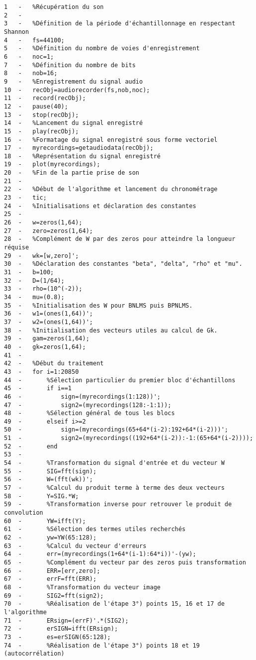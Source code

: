 \begin{verbatim}
1   -	%Récupération du son
2   -	
3   -	%Définition de la période d'échantillonnage en respectant Shannon
4   -	fs=44100;
5   -	%Définition du nombre de voies d'enregistrement
6   -	noc=1;
7   -	%Définition du nombre de bits
8   -	nob=16;
9   -	%Enregistrement du signal audio
10  -	recObj=audiorecorder(fs,nob,noc);
11  -	record(recObj);
12  -	pause(40);
13  -	stop(recObj);
14  -	%Lancement du signal enregistré
15  -	play(recObj);
16  -	%Formatage du signal enregistré sous forme vectoriel
17  -	myrecordings=getaudiodata(recObj);
18  -	%Représentation du signal enregistré
19  -	plot(myrecordings);
20  -	%Fin de la partie prise de son
21  -	
22  -	%Début de l'algorithme et lancement du chronométrage
23  -	tic;
24  -	%Initialisations et déclaration des constantes
25  -	
26  -	w=zeros(1,64);
27  -	zero=zeros(1,64);
28  -	%Complément de W par des zeros pour atteindre la longueur réquise
29  -	wk=[w,zero]';
30  -	%Déclaration des constantes "beta", "delta", "rho" et "mu".
31  -	b=100;
32  -	D=(1/64);
33  -	rho=(10^(-2));
34  -	mu=(0.8);
35  -	%Initialisation des W pour BNLMS puis BPNLMS.
36  -	w1=(ones(1,64))';
37  -	w2=(ones(1,64))';
38  -	%Initialisation des vecteurs utiles au calcul de Gk.
39  -	gam=zeros(1,64);
40  -	gk=zeros(1,64);
41  -	
42  -	%Début du traitement
43  -	for i=1:20850
44  -	    %Sélection particulier du premier bloc d'échantillons
45  -	    if i==1
46  -	        sign=(myrecordings(1:128))';
47  -	        sign2=(myrecordings(128:-1:1));
48  -	    %Sélection général de tous les blocs    
49  -	    elseif i>=2
50  -	        sign=(myrecordings(65+64*(i-2):192+64*(i-2)))';
51  -	        sign2=(myrecordings((192+64*(i-2)):-1:(65+64*(i-2))));
52  -	    end
53  -	    
54  -	    %Transformation du signal d'entrée et du vecteur W
55  -	    SIG=fft(sign);
56  -	    W=(fft(wk))';
57  -	    %Calcul du produit terme à terme des deux vecteurs
58  -	    Y=SIG.*W;
59  -	    %Transformation inverse pour retrouver le produit de convolution
60  -	    YW=ifft(Y);
61  -	    %Sélection des termes utiles recherchés
62  -	    yw=YW(65:128);
63  -	    %Calcul du vecteur d'erreurs
64  -	    err=(myrecordings(1+64*(i-1):64*i))'-(yw);
65  -	    %Complément du vecteur par des zeros puis transformation
66  -	    ERR=[err,zero];
67  -	    errF=fft(ERR);
68  -	    %Transformation du vecteur image
69  -	    SIG2=fft(sign2);
70  -	    %Réalisation de l'étape 3°) points 15, 16 et 17 de l'algorithme
71  -	    ERsign=(errF)'.*(SIG2);
72  -	    erSIGN=ifft(ERsign);
73  -	    es=erSIGN(65:128);
74  -	    %Réalisation de l'étape 3°) points 18 et 19 (autocorrélation)

\end{verbatim}
